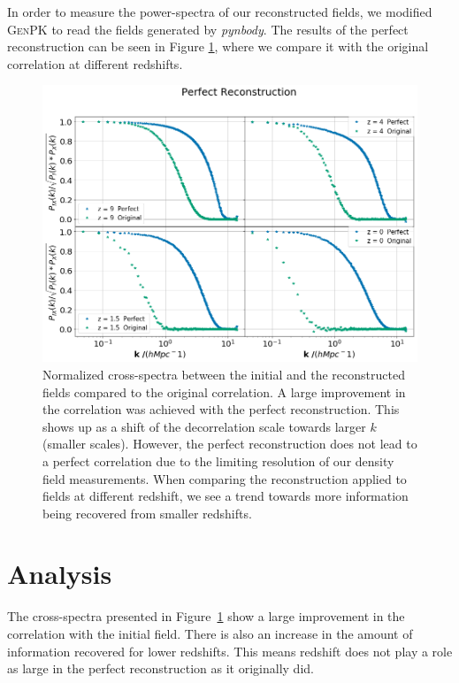 
In order to measure the power-spectra of our reconstructed fields, we modified \textsc{GenPK} to read the fields generated by \textit{pynbody}. The results of the perfect reconstruction can be seen in Figure \ref{fig:3.2}, where we compare it with the original correlation at different redshifts. 

\begin{figure}
    \centering
    \includegraphics[width=1\columnwidth]{images/perfRecon/perfRecon.png}%
    
    \caption{
    Normalized cross-spectra between the initial and the reconstructed fields compared to the original correlation. A large improvement in the correlation was achieved with the perfect reconstruction. This shows up as a shift of the decorrelation scale towards larger $k$ (smaller scales). However, the perfect reconstruction does not lead to a perfect correlation due to the limiting resolution of our density field measurements. When comparing the reconstruction applied to fields at different redshift, we see a trend towards more information being recovered from smaller redshifts.
    }
    
    \label{fig:3.2}
\end{figure}

\section{Analysis}

The cross-spectra presented in Figure~\ref{fig:3.2} show a large improvement in the correlation with the initial field. There is also an increase in the amount of information recovered for lower redshifts. This means redshift does not play a role as large in the perfect reconstruction as it originally did. 

